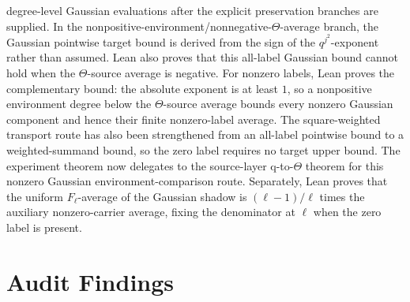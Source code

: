 \documentclass[11pt]{article}
\begin{document}
degree-level Gaussian evaluations after the explicit preservation branches are
supplied.  In the nonpositive-environment/nonnegative-\(\Theta\)-average branch,
the Gaussian pointwise target bound is derived from the sign of the
\(q^{j^2}\)-exponent rather than assumed.  Lean also proves that this
all-label Gaussian bound cannot hold when the \(\Theta\)-source average is
negative.  For nonzero labels, Lean proves the complementary bound: the
absolute exponent is at least \(1\), so a nonpositive environment degree below
the \(\Theta\)-source average bounds every nonzero Gaussian component and hence
their finite nonzero-label average.  The square-weighted transport route has
also been strengthened from an all-label pointwise bound to a weighted-summand
bound, so the zero label requires no target upper bound.  The experiment theorem
now delegates to the source-layer q-to-\(\Theta\) theorem for this nonzero
Gaussian environment-comparison route.  Separately, Lean proves that the
uniform \(F_\ell\)-average of the Gaussian shadow is
\((\ell-1)/\ell\) times the auxiliary nonzero-carrier average, fixing the
denominator at \(\ell\) when the zero label is present.

\section{Audit Findings}
\end{document}
